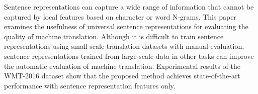 Sentence representations can capture a wide range of information that cannot be captured by local features based on character or word N-grams. This paper examines the usefulness of universal sentence representations for evaluating the quality of machine translation. Although it is difficult to train sentence representations using small-scale translation datasets with manual evaluation, sentence representations trained from large-scale data in other tasks can improve the automatic evaluation of machine translation. Experimental results of the WMT-2016 dataset show that the proposed method achieves state-of-the-art performance with sentence representation features only.
